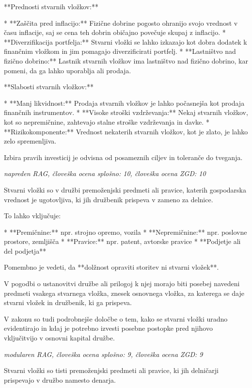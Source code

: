 \documentclass[a4paper,12pt,openright]{book}
\begin{document}
**Prednosti stvarnih vložkov:**

* **Zaščita pred inflacijo:** Fizične dobrine pogosto ohranijo svojo vrednost v času inflacije, saj se cena teh dobrin običajno povečuje skupaj z inflacijo.
* **Diverzifikacija portfelja:** Stvarni vložki se lahko izkazajo kot dobra dodatek k finančnim vložkom in jim pomagajo diverzificirati portfelj.
* **Lastništvo nad fizično dobrino:** Lastnik stvarnih vložkov ima lastništvo nad fizično dobrino, kar pomeni, da ga lahko uporablja ali prodaja.

**Slabosti stvarnih vložkov:**

* **Manj likvidnost:** Prodaja stvarnih vložkov je lahko počasnejša kot prodaja finančnih instrumentov.
* **Visoke stroški vzdrževanja:** Nekaj stvarnih vložkov, kot so nepremičnine, zahtevajo stalne stroške vzdrževanja in davke.
* **Rizikokomponente:** Vrednost nekaterih stvarnih vložkov, kot je zlato, je lahko zelo spremenljiva.

Izbira pravih investicij je odvisna od posameznih ciljev in toleranče do tveganja.

\vspace{0.5cm}
\textit{napreden RAG, človeška ocena splošno: 10, človeška ocena ZGD: 10}

Stvarni vložki so v družbi premoženjski predmeti ali pravice, katerih gospodarska vrednost je ugotovljiva, ki jih družbenik prispeva v zameno za delnice.

To lahko vključuje:

* **Premičnine:**  npr. strojno opremo, vozila
* **Nepremičnine:** npr. poslovne prostore, zemljišča
* **Pravice:** npr. patent, avtorske pravice
* **Podjetje ali del podjetja**

Pomembno je vedeti, da **dolžnost opraviti storitev ni stvarni vložek**.

V pogodbi o ustanovitvi družbe ali prilogoj k njej morajo biti posebej navedeni predmeti vsakega stvarnega vložka, znesek osnovnega vložka, za katerega se daje stvarni vložek in družbenik, ki ga prispeva.


V zakonu so tudi podrobnejše določbe o tem, kako se stvarni vložki uradno evidentirajo in kdaj je potrebno izvesti posebne postopke pred njihovo vključitvijo v osnovni kapital družbe.

\vspace{0.5cm}
\textit{modularen RAG, človeška ocena splošno: 9, človeška ocena ZGD: 9}

Stvarni vložki so tisti premoženjski predmeti ali pravice, ki jih delničarji prispevajo v družbo namesto denarja.
\end{document}
